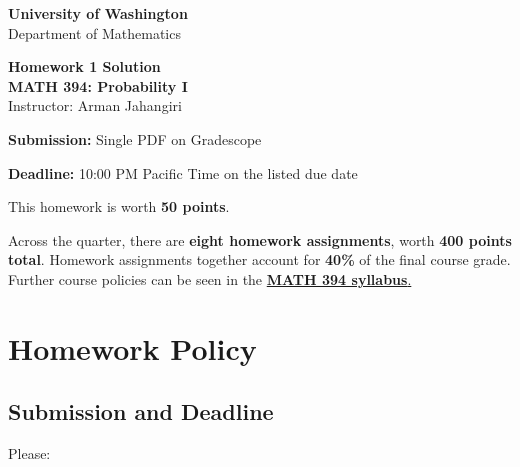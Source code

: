 \documentclass[11pt]{article}
\newcommand{\course}{MATH 394: Probability I}
\newcommand{\department}{Department of Mathematics}
\newcommand{\university}{University of Washington}
\begin{document}
\begin{titlepage}
\centering
\vspace*{1.2cm}

{\Large \textbf{\university}}\\
{\large \department}

\vspace{1.5cm}

{\Huge \color{uwpurple}\textbf{Homework 1 Solution}}\\[0.25cm]
{\Large \textbf{\course}}\\[0.25cm]
{\large Instructor: Arman Jahangiri}

\vspace{1cm}

\begin{tcolorbox}[
    width=0.78\textwidth,
    colback=softpurple,
    colframe=uwpurple,
    boxrule=0.9pt,
    arc=3mm
]
\centering

\textbf{Submission:} Single PDF on Gradescope

\textbf{Deadline:} 10:00 PM Pacific Time on the listed due date
\end{tcolorbox}

\vspace{0.8cm}

\begin{tcolorbox}[
    width=0.86\textwidth,
    colback=white,
    colframe=uwgold,
    boxrule=0.8pt,
    arc=3mm
]
This homework is worth \textbf{50 points}.

Across the quarter, there are \textbf{eight homework assignments}, worth \textbf{400 points total}. Homework assignments together account for \textbf{40\%} of the final course grade. Further course policies can be seen in the \href{https://armanjg.github.io/MATH-394-Probability-1-v2/}{\textbf{MATH 394 syllabus}.}
\end{tcolorbox}

\vfill


\end{titlepage}

\section*{Homework Policy}

\subsection*{Submission and Deadline}

Please:
\end{document}
